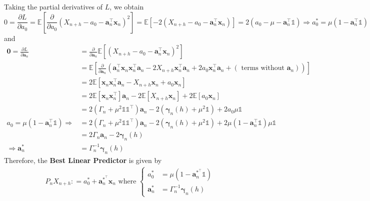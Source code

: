 \documentclass[11pt]{article}
\theoremstyle{plain} %
\theoremstyle{remark}
\newcommand{\bOne}{\mathds{1}}
\newcommand{\EE}{\mathbb{E}}
\begin{document}
Taking the partial derivatives of $L$, we obtain
$$
  0 = \frac{\partial L}{\partial a_0}
  = \EE\left[\frac{\partial }{\partial a_0}(X_{n+h}-a_0-\mathbf{a}_n^\top \mathbf{x}_n)^2\right]
  = \EE\left[-2(X_{n+h}-a_0-\mathbf{a}_n^\top \mathbf{x}_n)\right] = 2(a_0-\mu-\mathbf{a}_n^\top\bOne)
  \Longrightarrow a_0^* = \mu(1-\mathbf{a}_n^\top\bOne)
$$
and
\begin{align*}
  \bm{0} = \frac{\partial L}{\partial \mathbf{a}_n} & = \frac{\partial }{\partial \mathbf{a}_n}\EE\left[(X_{n+h} - a_0 - \mathbf{a}_n^\top \mathbf{x}_n)^2\right]                                                                         \\
                                                    & =\EE\left[\frac{\partial }{\partial \mathbf{a}_n}\left(\mathbf{a}_n^\top\mathbf{x}_n \mathbf{x}_n^\top\mathbf{a}_n - 2X_{n+h}\mathbf{x}_n^\top \mathbf{a}_n + 2a_0\mathbf{x}_n^\top
  \mathbf{a}_n + (\text{ terms without } \mathbf{a}_n)\right)\right]                                                                                                                                                                      \\
                                                    & =2 \EE[\mathbf{x}_n \mathbf{x}_n^\top\mathbf{a}_n - X_{n+h}\mathbf{x}_n + a_0\mathbf{x}_n]                                                                                          \\
                                                    & =2 \EE[\mathbf{x}_n \mathbf{x}_n^\top]\mathbf{a}_n - 2\EE[X_{n+h}\mathbf{x}_n] + 2\EE[a_0\mathbf{x}_n]                                                                              \\
                                                    & =2 (\Gamma_n +\mu^2 \bOne\bOne^\top)\mathbf{a}_n - 2(\bm{\gamma}_n(h) + \mu^2 \bOne) + 2a_0\mu \bOne                                                                                \\
  a_0 = \mu(1-\mathbf{a}_n^\top\bOne) \Longrightarrow
                                                    & =2 (\Gamma_n +\mu^2 \bOne\bOne^\top)\mathbf{a}_n - 2(\bm{\gamma}_n(h) + \mu^2 \bOne) + 2 \mu(1-\mathbf{a}_n^\top\bOne)\mu \bOne                                                     \\
                                                    & =2 \Gamma_n \mathbf{a}_n - 2\bm{\gamma}_n(h)                                                                                                                                        \\
  \Longrightarrow \mathbf{a}_n^*                    &
  = \Gamma_n^{-1}\bm{\gamma}_n(h)
\end{align*}
Therefore, the \textbf{Best Linear Predictor} is given by
\begin{align}
  P_n X_{n+h} : = a_0^* + \mathbf{a}_n^{*^\top} \mathbf{x}_n \text{ where }
  \begin{cases}
    a_0^*          & = \mu(1-\mathbf{a}_n^{*^\top}\bOne) \\
    \mathbf{a}_n^* & = \Gamma_n^{-1}\bm{\gamma}_n(h)
  \end{cases} \label{eq: Best Linear Predictor}
\end{align}
\end{document}
